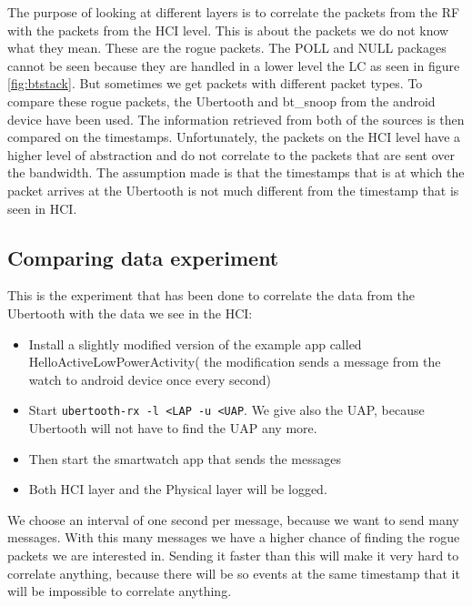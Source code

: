 The purpose of looking at different layers is to correlate the packets from the RF with the packets from the HCI level. This is about the packets we do not know what they mean. These are the rogue packets. The POLL and NULL packages cannot be seen because they are handled in a lower level the LC as seen in figure \ref{fig:btstack}. But sometimes we get packets with different packet types. To compare these rogue packets, the Ubertooth and bt\_snoop from the android device have been used. The information retrieved from both of the sources is then compared on the timestamps. Unfortunately, the packets on the HCI level have a higher level of abstraction and do not correlate to the packets that are sent over the bandwidth. The assumption made is that the timestamps that is at which the packet arrives at the Ubertooth is not much different from the timestamp that is seen in HCI.
\subsection{Comparing data experiment}
This is the experiment that has been done to correlate the data from the Ubertooth with the data we see in the HCI:
\begin{itemize}
\item Install a slightly modified version of the example app called HelloActiveLowPowerActivity( the modification sends a message from the watch to android device once every second)
\item Start \verb|ubertooth-rx -l <LAP -u <UAP|. We give also the UAP, because Ubertooth will not have to find the UAP any more. 
\item Then start the smartwatch app that sends the messages
\item Both HCI layer and the Physical layer will be logged.
\end{itemize}
We choose an interval of one second per message, because we want to send many messages. With this many messages we have a higher chance of finding the rogue packets we are interested in. Sending it faster than this will make it very hard to correlate anything, because there will be so events at the same timestamp that it will be impossible to correlate anything.
